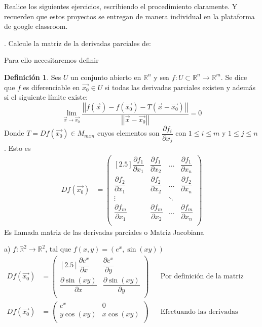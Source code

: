 \documentclass[letterpaper]{article}
\renewcommand{\d}{\partial}
\providecommand{\norm}[1]{\left|\left|#1\right|\right|}
\newcommand{\R}{\mathds{R}}
\renewcommand{\*}{\cdot}
\theoremstyle{definition}
\newtheorem{definition}{Definición}
\begin{document}
\noindent Realice los siguientes ejercicios, escribiendo el procedimiento claramente. Y recuerden que estos proyectos se entregan de manera individual en la plataforma de google classroom. 





.  Calcule la matriz de la derivadas parciales de: 

Para ello necesitaremos definir
\begin{definition}
	Ses $ U $ un conjunto abierto en $ \R^n $ y sea $ f:U\subset \R^n \to \R^m $. Se dice que $ f $ es diferenciable en $ \vec{x_0} \in U$  si todas las derivadas parciales existen y además si el siguiente límite existe: 
	\[ \lim\limits_{\vec{x} \to \vec{x_0} } \dfrac{\norm{f(\vec{x}) - f(\vec{x_0}) - T(\vec{x} - \vec{x_0})} }{\norm{\vec{x} - \vec{x_0}}} =0 \]
	Donde $ T= Df(\vec{x_0}) \in M_{mxn} $ cuyos elementos son $ \dfrac{\partial f_i}{\partial x_j} $ con $ 1 \leq i \leq m $ y $ 1 \leq j \leq n $. Esto es
	\begin{align*}
		Df(\vec{x_0}) &= \begin{pmatrix}[2.5]
		\dfrac{\partial f_1}{\d x_1 } & \dfrac{\d f_1}{\d x_2} & \dots & \dfrac{\d f_1}{\d x_n}\\
		\dfrac{\partial f_2}{\d x_1 } & \dfrac{\d f_2}{\d x_2} & \dots & \dfrac{\d f_2}{\d x_n}\\
		\vdots & & \ddots & \\
		\dfrac{\partial f_m}{\d x_1 } & \dfrac{\d f_m}{\d x_2} & \dots & \dfrac{\d f_m}{\d x_n}\\
		\end{pmatrix}
	\end{align*}
	Es llamada matriz de las derivadas parciales o Matriz Jacobiana
\end{definition}


\noindent a) $f: \mathbb{R}^2  \longrightarrow \mathbb{R}^2$, tal que $f(x,y) = (e^x,\sin(xy))$\\
\begin{align*}
	Df(\vec{x_0}) &= \begin{pmatrix}[2.5]
	\dfrac{\d e^x}{\d x} & \dfrac{\d e^x}{\d y}\\
	\dfrac{\d \sin(xy)}{\d x} & \dfrac{\d \sin(xy)}{\d y}\\
	\end{pmatrix} && \text{Por definición de la matriz Jacobiana}\\
	Df(\vec{x_0}) &= \begin{pmatrix}
	e^x & 0\\
	y\cos(xy) &x\cos(xy)\\
	\end{pmatrix} && \text{Efectuando las derivadas parciales}\\
\end{align*}
\end{document}
